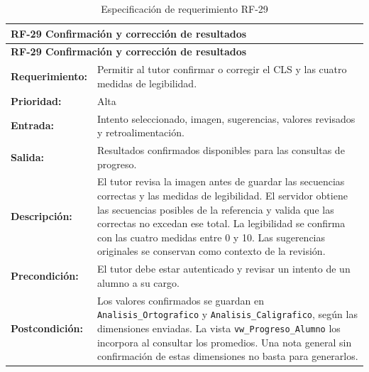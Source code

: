 \begin{longtable}{|p{3.2cm}|p{11.8cm}|}
\caption{Especificación de requerimiento RF-29}\label{tab:rf29} \\ \hline
\multicolumn{2}{|p{15cm}|}{\textbf{RF-29 Confirmación y corrección de resultados}} \\ \hline
\endfirsthead
\hline
\multicolumn{2}{|p{15cm}|}{\textbf{RF-29 Confirmación y corrección de resultados}} \\ \hline
\endhead
\textbf{Requerimiento:} & Permitir al tutor confirmar o corregir el CLS y las cuatro medidas de legibilidad. \\ \hline
\textbf{Prioridad:} & Alta \\ \hline
\textbf{Entrada:} & Intento seleccionado, imagen, sugerencias, valores revisados y retroalimentación. \\ \hline
\textbf{Salida:} & Resultados confirmados disponibles para las consultas de progreso. \\ \hline
\textbf{Descripción:} & El tutor revisa la imagen antes de guardar las secuencias correctas y las medidas de legibilidad. El servidor obtiene las secuencias posibles de la referencia y valida que las correctas no excedan ese total. La legibilidad se confirma con las cuatro medidas entre 0 y 10. Las sugerencias originales se conservan como contexto de la revisión. \\ \hline
\textbf{Precondición:} & El tutor debe estar autenticado y revisar un intento de un alumno a su cargo. \\ \hline
\textbf{Postcondición:} & Los valores confirmados se guardan en \texttt{Analisis\_Ortografico} y \texttt{Analisis\_Caligrafico}, según las dimensiones enviadas. La vista \texttt{vw\_Progreso\_Alumno} los incorpora al consultar los promedios. Una nota general sin confirmación de estas dimensiones no basta para generarlos. \\ \hline
\end{longtable}


